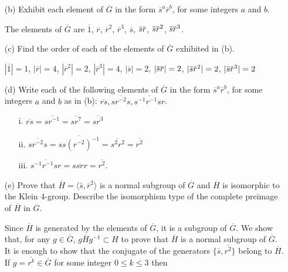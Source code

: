 \documentclass[12pt]{article}
\newcommand\nindent{.5pt}
\newcommand\noverline[1]{%
  \kern\nindent\overline{\kern-\nindent#1\kern-\nindent}\kern\nindent}
\begin{document}
\begin{enumerate}
\begin{enumerate}
\item[(b)] Exhibit each element of $\overline{G}$ in the form
$\overline{s}^a\overline{r}^b$, for some integers $a$ and $b$.
\begin{mybox}
    
    The elements of $\overline{G}$ are
    $\overline{1}$,  $\overline{r}$, $\overline{r}^2$,
    $\overline{r}^3$,  $\overline{s}$,
    $\noverline{s}\noverline{r}$,
    $\noverline{s}\noverline{r}^2$,
    $\noverline{s}\noverline{r}^3$.
\end{mybox}

\item[(c)] Find the order of each of the elements of
$\overline{G}$
exhibited in (b).
\begin{mybox}
    
    $|\overline{1}|=1$, $|\overline{r}|=4$,
    $|\overline{r}^2|=2$,
    $|\overline{r}^3|=4$,  $|\overline{s}|=2$,
    $|\noverline{s}\noverline{r}|=2$,
    $|\noverline{s}\noverline{r}^2|=2$,
    $|\noverline{s}\noverline{r}^3|=2$
\end{mybox}

\item[(d)] Write each of the following elements of
$\overline{G}$
in the form $\overline{s}^a\overline{r}^b$, for some
integers $a$ and
$b$ as in (b): $\overline{rs}, \overline{sr^{-2}s},
\overline{s^{-1}r^{-1}sr}$.
\begin{mybox}
    
    \begin{enumerate}
        \item[i.] $\overline{rs}=\overline{sr^{-1}}
            =\overline{sr^7}=\overline{sr^3}$
        \item[ii.] $\overline{sr^{-2}s} =
            \overline{ss(r^{-2})^{-1}} =
            \overline{s^2r^2} = \overline{r^2}$
        \item[iii.] $\overline{s^{-1}r^{-1}sr} =
            \overline{ssrr}=\overline{r^2}$.
    \end{enumerate}
\end{mybox}

\item[(e)] Prove that $\overline{H} = \langle\bar{s},
\overline{r}^2\rangle$
is a normal subgroup of $\overline{G}$ and $\overline{H}$ is
isomorphic to the Klein
4-group. Describe the isomorphism type of the complete preimage
of $\overline{H}$ in $G$.
\begin{mybox}

    Since $\overline{H}$ is generated by the elements of
    $\overline{G}$, it is a subgroup of $\overline{G}$.
    We show that, for any $g\in \overline{G}$,
    $g\overline{H}g^{-1}\subset H$ to prove that
    $\overline{H}$ is a normal subgroup of $\overline{G}$.
    It is enough to show that the conjugate
    of the generators $\{\overline{s},\overline{r^2}\}$
    belong to $\overline{H}$.
    If $g=\overline{r^k}\in \overline{G}$ for some integer
    $0\leq k\leq 3$ then


\end{mybox}
\end{enumerate}
\end{enumerate}
\end{document}
